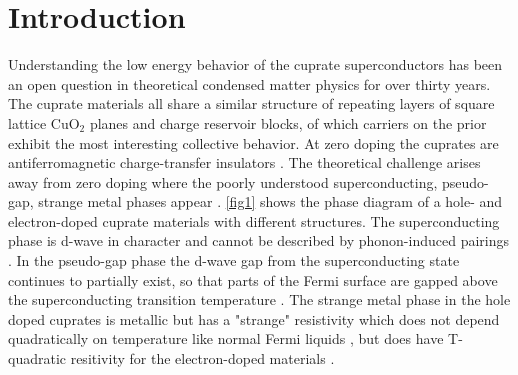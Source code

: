 \documentclass{article}
\begin{document}
\section{Introduction} 
Understanding the low energy behavior of the cuprate superconductors has been an open question in theoretical condensed matter physics for over thirty years. 
The cuprate materials all share a similar structure of repeating layers of square lattice CuO$_2$ planes and charge reservoir blocks, of which carriers on the prior exhibit the most interesting collective behavior. 
At zero doping the cuprates are antiferromagnetic charge-transfer insulators \cite{RevModPhys.78.17}. 
The theoretical challenge arises away from zero doping where the poorly understood superconducting, pseudo-gap, strange metal phases appear \cite{RevModPhys.84.1383}. 
\ref{fig1} shows the phase diagram of a hole- and electron-doped cuprate materials with different structures. 
The superconducting phase is d-wave in character and cannot be described by phonon-induced pairings \cite{PhysRevLett.71.2134,PhysRevLett.69.1431,PhysRevB.43.2778, PhysRevB.47.11314, PhysRevLett.70.1553, RevModPhys.67.515, RevModPhys.77.109, RevModPhys.79.353, RevModPhys.75.473}. 
In the pseudo-gap phase the d-wave gap from the superconducting state continues to partially exist, so that parts of the Fermi surface are gapped above the superconducting transition temperature \cite{ROSSATMIGNOD199186, RevModPhys.77.721, PhysRevLett.75.4114, PhysRevB.61.9752}.
The strange metal phase in the hole doped cuprates is metallic but has a "strange" resistivity which does not depend quadratically on temperature like normal Fermi liquids \cite{PhysRevLett.69.2975}, but does have T-quadratic resitivity for the electron-doped materials \cite{1989PhyC..161..415T}. 
\end{document}

